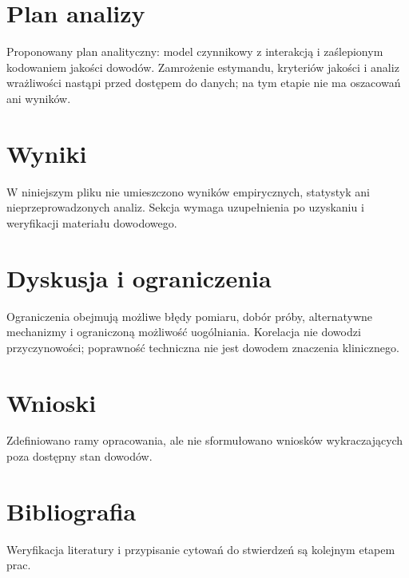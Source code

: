 \documentclass[11pt,a4paper]{article}
\begin{document}
\section{Plan analizy}

Proponowany plan analityczny: model czynnikowy z interakcją i zaślepionym kodowaniem jakości dowodów. Zamrożenie estymandu, kryteriów jakości i analiz wrażliwości nastąpi przed dostępem do danych; na tym etapie nie ma oszacowań ani wyników.

\section{Wyniki}

W niniejszym pliku nie umieszczono wyników empirycznych, statystyk ani nieprzeprowadzonych analiz. Sekcja wymaga uzupełnienia po uzyskaniu i weryfikacji materiału dowodowego.

\section{Dyskusja i ograniczenia}

Ograniczenia obejmują możliwe błędy pomiaru, dobór próby, alternatywne mechanizmy i ograniczoną możliwość uogólniania. Korelacja nie dowodzi przyczynowości; poprawność techniczna nie jest dowodem znaczenia klinicznego.

\section{Wnioski}

Zdefiniowano ramy opracowania, ale nie sformułowano wniosków wykraczających poza dostępny stan dowodów.

\section*{Bibliografia}

Weryfikacja literatury i przypisanie cytowań do stwierdzeń są kolejnym etapem prac.
\end{document}
